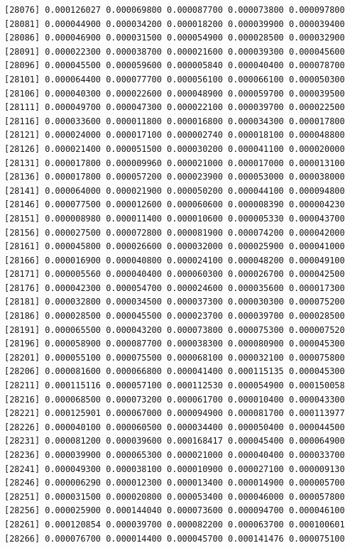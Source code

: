 \documentclass[]{article}
\begin{document}
\begin{verbatim}
[28076] 0.000126027 0.000069800 0.000087700 0.000073800 0.000097800
[28081] 0.000044900 0.000034200 0.000018200 0.000039900 0.000039400
[28086] 0.000046900 0.000031500 0.000054900 0.000028500 0.000032900
[28091] 0.000022300 0.000038700 0.000021600 0.000039300 0.000045600
[28096] 0.000045500 0.000059600 0.000005840 0.000040400 0.000078700
[28101] 0.000064400 0.000077700 0.000056100 0.000066100 0.000050300
[28106] 0.000040300 0.000022600 0.000048900 0.000059700 0.000039500
[28111] 0.000049700 0.000047300 0.000022100 0.000039700 0.000022500
[28116] 0.000033600 0.000011800 0.000016800 0.000034300 0.000017800
[28121] 0.000024000 0.000017100 0.000002740 0.000018100 0.000048800
[28126] 0.000021400 0.000051500 0.000030200 0.000041100 0.000020000
[28131] 0.000017800 0.000009960 0.000021000 0.000017000 0.000013100
[28136] 0.000017800 0.000057200 0.000023900 0.000053000 0.000038000
[28141] 0.000064000 0.000021900 0.000050200 0.000044100 0.000094800
[28146] 0.000077500 0.000012600 0.000060600 0.000008390 0.000004230
[28151] 0.000008980 0.000011400 0.000010600 0.000005330 0.000043700
[28156] 0.000027500 0.000072800 0.000081900 0.000074200 0.000042000
[28161] 0.000045800 0.000026600 0.000032000 0.000025900 0.000041000
[28166] 0.000016900 0.000040800 0.000024100 0.000048200 0.000049100
[28171] 0.000005560 0.000040400 0.000060300 0.000026700 0.000042500
[28176] 0.000042300 0.000054700 0.000024600 0.000035600 0.000017300
[28181] 0.000032800 0.000034500 0.000037300 0.000030300 0.000075200
[28186] 0.000028500 0.000045500 0.000023700 0.000039700 0.000028500
[28191] 0.000065500 0.000043200 0.000073800 0.000075300 0.000007520
[28196] 0.000058900 0.000087700 0.000038300 0.000080900 0.000045300
[28201] 0.000055100 0.000075500 0.000068100 0.000032100 0.000075800
[28206] 0.000081600 0.000066800 0.000041400 0.000115135 0.000045300
[28211] 0.000115116 0.000057100 0.000112530 0.000054900 0.000150058
[28216] 0.000068500 0.000073200 0.000061700 0.000010400 0.000043300
[28221] 0.000125901 0.000067000 0.000094900 0.000081700 0.000113977
[28226] 0.000040100 0.000060500 0.000034400 0.000050400 0.000044500
[28231] 0.000081200 0.000039600 0.000168417 0.000045400 0.000064900
[28236] 0.000039900 0.000065300 0.000021000 0.000040400 0.000033700
[28241] 0.000049300 0.000038100 0.000010900 0.000027100 0.000009130
[28246] 0.000006290 0.000012300 0.000013400 0.000014900 0.000005700
[28251] 0.000031500 0.000020800 0.000053400 0.000046000 0.000057800
[28256] 0.000025900 0.000144040 0.000073600 0.000094700 0.000046100
[28261] 0.000120854 0.000039700 0.000082200 0.000063700 0.000100601
[28266] 0.000076700 0.000014400 0.000045700 0.000141476 0.000075100

\end{verbatim}
\end{document}
